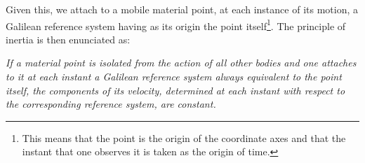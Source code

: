 Given this, we attach to a mobile material point, at each instance of its motion, a Galilean reference system having as its origin the point itself\footnote{This means that the point is the origin of the coordinate axes and that the instant that one observes it is taken as the origin of time.}. The principle of inertia is then enunciated as:

\textit{If a material point is isolated from the action of all other bodies and one attaches to it at each instant a Galilean reference system always equivalent to the point itself, the components of its velocity, determined at each instant with respect to the corresponding reference system, are constant.}

% 